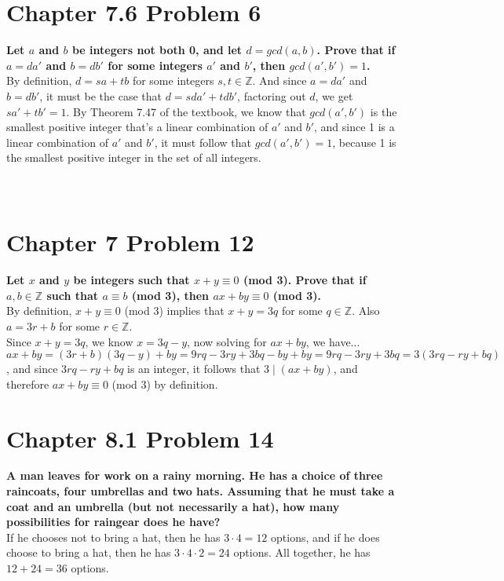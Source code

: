 \documentclass[10pt]{article}
\begin{document}
\section{Chapter 7.6 Problem 6}
\textbf{Let $a$ and $b$ be integers not both 0, and let $d = gcd(a,b)$.  Prove that if $a = da'$ and $b = db'$ for some integers $a'$ and $b'$,
then $gcd(a',b') = 1$.} \\

By definition, $d = sa + tb$ for some integers $s,t \in \mathbb{Z}$.  And since $a = da'$ and $b = db'$, it must be the case that
$d = sda' + tdb'$, factoring out $d$, we get $sa' + tb' = 1$.  By Theorem 7.47 of the textbook, we know that $gcd(a',b')$ is the smallest positive
integer that's a linear combination of $a'$ and $b'$, and since 1 is a linear combination of $a'$ and $b'$, it must follow that $gcd(a',b') = 1$, 
because 1 is the smallest positive integer in the set of all integers. \\\\\\

    
\section{Chapter 7 Problem 12}
\textbf{Let $x$ and $y$ be integers such that $x + y \equiv 0$ (mod 3).  Prove that if $a,b \in \mathbb{Z}$ such that $a \equiv b$ (mod 3),
then $ax + by \equiv 0$ (mod 3).} \\

By definition, $x + y \equiv 0$ (mod 3) implies that $x + y = 3q$ for some $q \in \mathbb{Z}$.  Also $a = 3r + b$ for some $r \in \mathbb{Z}$.  \\

Since $x + y = 3q$, we know $x = 3q - y$, now solving for $ax + by$, we have... \\
$ax + by = (3r + b)(3q - y) + by = 9rq - 3ry + 3bq - by + by = 9rq - 3ry + 3bq = 3(3rq - ry + bq)$, and since $3rq - ry + bq$ is an integer, it
follows that $3 \mid (ax + by)$, and therefore $ax + by \equiv 0$ (mod 3) by definition.


\section{Chapter 8.1 Problem 14}
\textbf{A man leaves for work on a rainy morning. He has a choice of three raincoats, four umbrellas and two hats. Assuming that he must take
a coat and an umbrella (but not necessarily a hat), how many possibilities for raingear does he have?} \\

If he chooses not to bring a hat, then he has $3 \cdot 4 = 12$ options, and if he does choose to bring a hat, then he has 
$3 \cdot 4 \cdot 2 = 24$ options.  All together, he has $12 + 24 = 36$ options.
\end{document}
